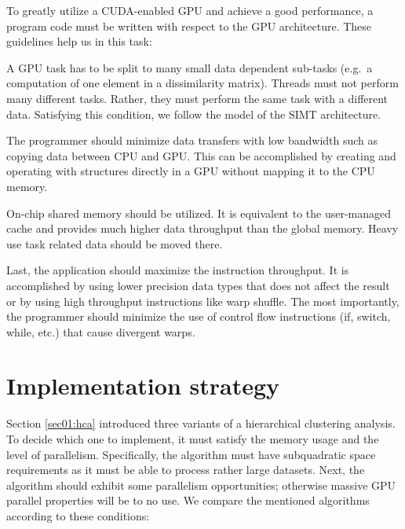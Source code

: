 To greatly utilize a CUDA-enabled GPU and achieve a good performance, a program code must be written with respect to the GPU architecture. These guidelines help us in this task:

A GPU task has to be split to many small data dependent sub-tasks (e.g.~a computation of one element in a dissimilarity matrix). Threads must not perform many different tasks. Rather, they must perform the same task with a different data. Satisfying this condition, we follow the model of the SIMT architecture.

The programmer should minimize data transfers with low bandwidth such as copying data between CPU and GPU. This can be accomplished by creating and operating with structures directly in a GPU without mapping it to the CPU memory.


On-chip shared memory should be utilized. It is equivalent to the user-ma\-na\-ged cache and provides much higher data throughput than the global memory. 
Heavy use task related data should be moved there.

Last, the application should maximize the instruction throughput. It is accomplished by using lower precision data types that does not affect the result or by using high throughput instructions like warp shuffle. The most importantly, the programmer should minimize the use of control flow instructions (if, switch, while, etc.) that cause divergent warps. 


\section{Implementation strategy}
\label{sec03:impl}

Section \ref{sec01:hca} introduced three variants of a hierarchical clustering analysis. To decide which one to implement, it must satisfy the memory usage and the level of parallelism. Specifically, the algorithm must have subquadratic space requirements as it must be able to process rather large datasets. Next, the algorithm should exhibit some parallelism opportunities; otherwise massive GPU parallel properties will be to no use.  We compare the mentioned algorithms according to these conditions:

